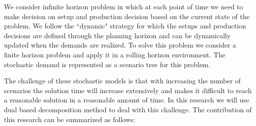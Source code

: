 \documentclass[10pt]{article}
\begin{document}
We consider infinite horizon problem in which at each point of time we need to make decision on setup and production decision based on the current state of the problem. We follow the ``dynamic" strategy \cite{bookbinder1988strategies} for which the setups and production decisions are defined through the planning horizon and can be dynamically updated when the demands are realized. To solve this problem we consider a finite horizon problem and apply it in a rolling horizon environment. The stochastic demand is represented as a scenario tree for this problem.

The challenge of these stochastic models is that with increasing the number of scenarios the solution time will increase extensively and makes it difficult to reach a reasonable solution in a reasonable amount of time. In this research we will use dual based decomposition method to deal with this challenge. 
The contribution of this research can be summarized as follows:
\end{document}
